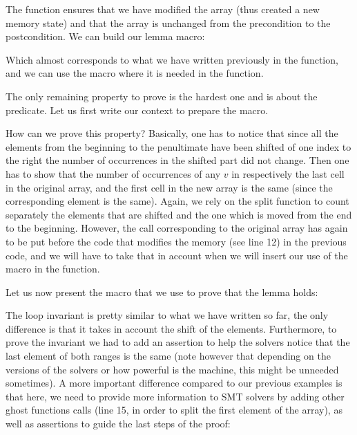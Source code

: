 The function  ensures that we have
modified the array (thus created a new memory state) and that the array is
unchanged from the precondition to the postcondition. We can build our
lemma macro:




Which almost corresponds to what we have written previously in the
 function, and we can use the macro where it is needed
in the  function.




The only remaining property to prove is the hardest one and is about the
 predicate. Let us first write our context to prepare
the macro.




How can we prove this property? Basically, one has to notice that since all the
elements from the beginning to the penultimate have been shifted of one index
to the right the number of occurrences in the shifted part did not change. Then
one has to show that the number of occurrences of any $v$ in respectively the
last cell in the original array, and the first cell in the new array is the same
(since the corresponding element is the same). Again, we rely on the split
function to count separately the elements that are shifted and the one which is
moved from the end to the beginning. However, the call corresponding to the
original array has again to be put before the code that modifies the memory (see
line 12) in the previous code, and we will have to take that in account when we
will insert our use of the macro in the  function.


Let us now present the macro that we use to prove that the lemma holds:




The loop invariant is pretty similar to what we have written so far, the only
difference is that it takes in account the shift of the elements. Furthermore,
to prove the invariant we had to add an assertion to help the solvers notice
that the last element of both ranges is the same (note however that depending
on the versions of the solvers or how powerful is the machine, this might be
unneeded sometimes). A more important difference compared to our previous
examples is that here, we need to provide more information to SMT solvers by
adding other ghost functions calls (line 15, in order to split the first
element of the array), as well as assertions to guide the last steps of the
proof:



